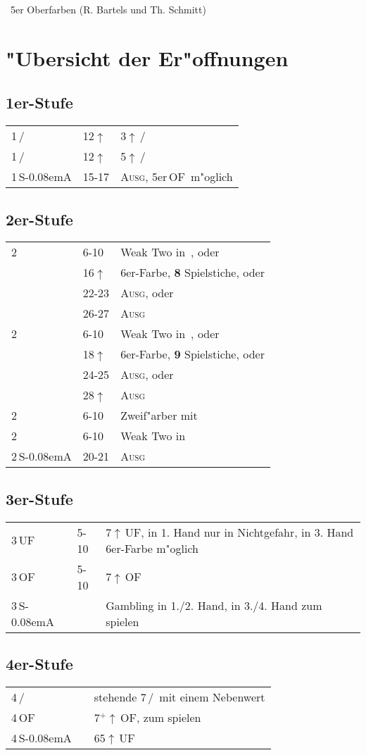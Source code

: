 \documentclass[11pt,german,twocolumn]{scrartcl}
\renewcommand{\Cl}{{\color{ClColor}{$\clubsuit$}}}
\renewcommand{\Di}{{\color{DiColor}{$\vardiamondsuit$}}}
\renewcommand{\He}{{\color{HeColor}{$\varheartsuit$}}}
\renewcommand{\Sp}{{\color{SpColor}{$\spadesuit$}}}
\def\pik{\,\Sp}
\def\coe{\,\He}
\def\kar{\,\Di}
\def\tre{\,\Cl}
\def\mi{\,\Cl /\Di}
\def\ma{\,\He /\Sp}
\def\good{$^+$}
\def\pl{$\uparrow$}
\def\uf{\textsf{\,UF}}
\def\of{\textsf{\,OF}}
\def\SA{\textsf{\,S\kern-0.08emA}}
\def\bal{\textsc{Ausg}}
\newcommand\bidins[1]%
{%
\begin{flushleft}
\begin{tabularx}{\columnwidth}{llX}%
#1
\end{tabularx}%
\end{flushleft}
}
\begin{document}
\setlength{\itemsep}{0ex plus0.2ex}

\onecolumn
{\centering\Huge\ 5er Oberfarben (R. Bartels und Th. Schmitt)}
\tableofcontents
\twocolumn

\section{"Ubersicht der Er"offnungen}

\subsection*{1er-Stufe}
\bidins{%
1\mi & 12\pl	& 3\pl \mi\\[1ex]
1\ma & 12\pl	& 5\pl \ma\\[1ex]
1\SA & 15-17	& \bal, 5er\of\ m"oglich
}

\subsection*{2er-Stufe}
\bidins{%
2\tre	& 6-10	& Weak Two in \kar, oder\\
	& 16\pl	& 6er-Farbe, \textbf{8} Spielstiche, oder\\
	& 22-23	& \bal, oder\\
	& 26-27	& \bal\\[1ex]
2\kar	& 6-10	& Weak Two in \coe, oder\\
	& 18\pl	& 6er-Farbe, \textbf{9} Spielstiche, oder\\
	& 24-25	& \bal, oder\\
	& 28\pl	& \bal\\[1ex]
2\coe	& 6-10	& Zweif"arber mit \coe\\[1ex]
2\pik	& 6-10	& Weak Two in \pik\\[1ex]
2\SA	& 20-21	& \bal
}

\subsection*{3er-Stufe}
\bidins{%
3\uf	& 5-10	& 7\pl{}\uf, in 1. Hand nur in Nichtgefahr, in 3. Hand 6er-Farbe m"oglich\\[1ex]
3\of	& 5-10	& 7\pl{}\of\\[1ex]
3\SA	& 	& Gambling in 1./2. Hand, in 3./4. Hand zum spielen
}

\subsection*{4er-Stufe}
\bidins{%
4\mi	& 	& stehende 7\ma\ mit einem Nebenwert\\[1ex]
4\of	&	& 7\good\pl\of, zum spielen\\[1ex]
4\SA	&	& 65\pl\uf
}
\end{document}
